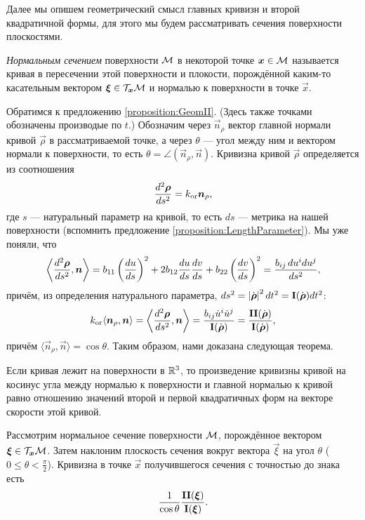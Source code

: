 Далее мы опишем геометрический смысл главных кривизн и второй квадратичной формы, для этого мы будем рассматривать сечения поверхности плоскостями. 

\begin{definition}
	\textit{Нормальным сечением} поверхности $\mathcal{M}$ в некоторой точке $\boldsymbol{x} \in \mathcal{M}$ называется кривая в пересечении этой поверхности и плокости, порождённой каким-то касательным вектором $\boldsymbol{\xi} \in \mathcal{T}_{\boldsymbol{x}}\mathcal{M}$ и нормалью к поверхности в точке $\vec{x}$.
\end{definition}

Обратимся к предложению \ref{proposition:GeomII}. (Здесь также точками обозначены производые по $t$.) Обозначим через $\vec{n}_\rho$ вектор главной нормали кривой $\vec{\rho}$ в рассматриваемой точке, а через $\theta$ --- угол между ним и вектором нормали к поверхности, то есть $\theta = \angle(\vec{n}_\rho, \vec{n})$. Кривизна\footnotemark{} кривой $\vec{\rho}$ определяется из соотношения
\[
	\frac{d^2\boldsymbol{\rho}}{ds^2} = k_{\mathrm{or}}\boldsymbol{n}_\rho,
\]
где $s$ --- натуральный параметр на кривой, то есть $ds$ --- метрика на нашей поверхности (вспомнить предложение \ref{proposition:LengthParameter}). Мы уже поняли, что
\[
	\left\langle\frac{d^2\boldsymbol{\rho}}{ds^2}, \boldsymbol{n}\right\rangle = b_{11}\left(\frac{du}{ds}\right)^2 + 2b_{12}\frac{du}{ds}\frac{dv}{ds} + b_{22}\left(\frac{dv}{ds}\right)^2 = \frac{b_{ij}\,du^idu^j}{ds^2},
\]
причём, из определения натурального параметра, $ds^2 = \left\lvert\dot{\boldsymbol{\rho}}\right\rvert^2dt^2 = \boldsymbol{\operatorname{I}}(\dot{\boldsymbol{\rho}})dt^2$:
\[
	k_{\mathrm{or}}\langle\boldsymbol{n}_\rho, \boldsymbol{n}\rangle = \left\langle\frac{d^2\boldsymbol{\rho}}{ds^2}, \boldsymbol{n}\right\rangle = \frac{b_{ij}\dot{u}^i\dot{u}^j}{\boldsymbol{\operatorname{I}}(\dot{\boldsymbol{\rho}})} = \frac{\boldsymbol{\operatorname{II}}(\dot{\boldsymbol{\rho}})}{\boldsymbol{\operatorname{I}}(\dot{\boldsymbol{\rho}})},
\]
причём $\langle\vec{n}_\rho, \vec{n}\rangle = \cos\theta$. Таким образом, нами доказана следующая теорема.


\begin{theorem}
	Если кривая лежит на поверхности в $\mathbb{R}^3$, то произведение кривизны кривой на косинус угла между нормалью к поверхности и главной нормалью к кривой равно отношению значений второй и первой квадратичных форм на векторе скорости этой кривой.
\end{theorem}

\begin{corollary}
	Рассмотрим нормальное сечение поверхности $\mathcal{M}$, порождённое вектором $\boldsymbol{\xi} \in \mathcal{T}_{\boldsymbol{x}}\mathcal{M}$. Затем наклоним плоскость сечения вокруг вектора $\vec{\xi}$ на угол $\theta$ ($0 \leqslant \theta < \frac{\pi}{2}$). Кривизна в точке $\vec{x}$ получившегося сечения с точностью до знака есть
	\[
		\frac{1}{\cos\theta}\frac{\boldsymbol{\operatorname{II}}(\boldsymbol{\xi})}{\boldsymbol{\operatorname{I}}(\boldsymbol{\xi})}.
	\]
\end{corollary}

